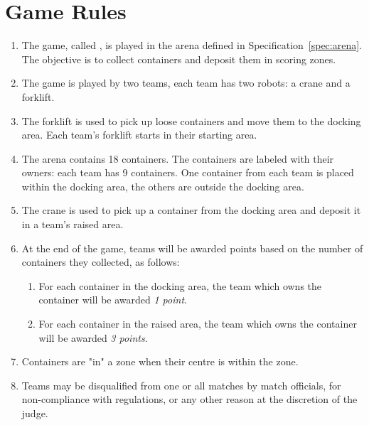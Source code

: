 \section{Game Rules}
\label{sec:rules}

\begin{enumerate}
  \item The game, called \emph{\gamename}, is played in the arena defined in
        Specification~\ref{spec:arena}. The objective is to collect containers
        and deposit them in scoring zones.
  \item The game is played by two teams, each team has two robots: a crane and
        a forklift.
  \item The forklift is used to pick up loose containers and move them to the
        docking area. Each team's forklift starts in their starting area.
  \item The arena contains 18 containers. The containers are labeled with
        their owners: each team has 9 containers. One container from each
        team is placed within the docking area, the others are outside the
        docking area.
  \item The crane is used to pick up a container from the docking area and
        deposit it in a team's raised area.
  \item At the end of the game, teams will be awarded points based on the
        number of containers they collected, as follows:
  \begin{enumerate}
    \item For each container in the docking area, the team which owns the
          container will be awarded \emph{1 point}.
    \item For each container in the raised area, the team which owns the
          container will be awarded \emph{3 points}.
  \end{enumerate}
  \item Containers are "in" a zone when their centre is within the zone.
  \item Teams may be disqualified from one or all matches by match officials,
        for non-compliance with regulations, or any other reason at the
        discretion of the judge.
\end{enumerate}
